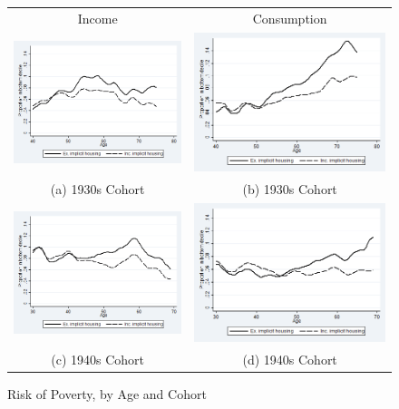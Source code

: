 \begin{figure}
\caption{Risk of Poverty, by Age and Cohort }
\centering
\begin{tabular}{c c}
Income & Consumption\\
\includegraphics[width=.5\linewidth]{pictures/cohort2_agerisksmooth_inc.png} &
\includegraphics[width=.5\linewidth]{pictures/cohort2_agerisksmooth_con.png} \\
(a) 1930s Cohort & (b) 1930s Cohort \\
\includegraphics[width=.5\linewidth]{pictures/cohort3_agerisksmooth_inc.png} &
\includegraphics[width=.5\linewidth]{pictures/cohort3_agerisksmooth_con.png} \\
(c) 1940s Cohort & (d) 1940s Cohort \\
\end{tabular}
\label{fig:povage_cohort_restrict}
\end{figure}

